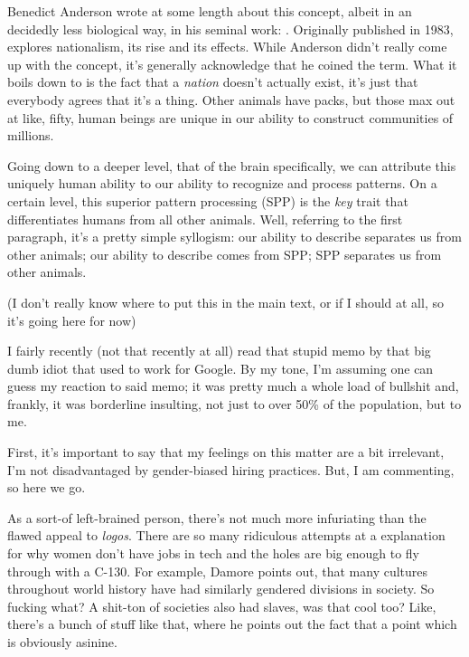 \documentclass[../butidigress.tex]{subfiles}
\begin{document}
Benedict Anderson wrote at some length about this concept, albeit in an decidedly less biological way, in his seminal work: .
Originally published in 1983,  explores nationalism, its rise and its effects.
While Anderson didn't really come up with the concept, it's generally acknowledge that he coined the term.
What it boils down to is the fact that a \emph{nation} doesn't actually exist, it's just that everybody agrees that it's a thing\autocite{imaginedcommunities}.
Other animals have packs, but those max out at like, fifty, human beings are unique in our ability to construct communities of millions.

Going down to a deeper level, that of the brain specifically, we can attribute this uniquely human ability to our ability to recognize and process patterns\autocite{spphumans}.
On a certain level, this superior pattern processing (SPP) is the \emph{key} trait that differentiates humans from all other animals.
Well, referring to the first paragraph, it's a pretty simple syllogism: our ability to describe separates us from other animals; our ability to describe comes from SPP; SPP separates us from other animals.

(I don't really know where to put this in the main text, or if I should at all, so it's going here for now)

I fairly recently (not that recently at all) read that stupid memo by that big dumb idiot that used to work for Google.
By my tone, I'm assuming one can guess my reaction to said memo; it was pretty much a whole load of bullshit and, frankly, it was borderline insulting, not just to over 50\% of the population, but to me.

First, it's important to say that my feelings on this matter are a bit irrelevant, I'm not disadvantaged by gender-biased hiring practices.
But, I am commenting, so here we go.

As a sort-of left-brained person, there's not much more infuriating than the flawed appeal to \textit{logos}.
There are so many ridiculous attempts at a  explanation for why women don't have jobs in tech and the holes are big enough to fly through with a C-130.
For example, Damore points out, that many cultures throughout world history have had similarly gendered divisions in society.
So fucking what?
A shit-ton of societies also had slaves, was that cool too?
Like, there's a bunch of stuff like that, where he points out the fact that  a point which is obviously asinine.
\end{document}
